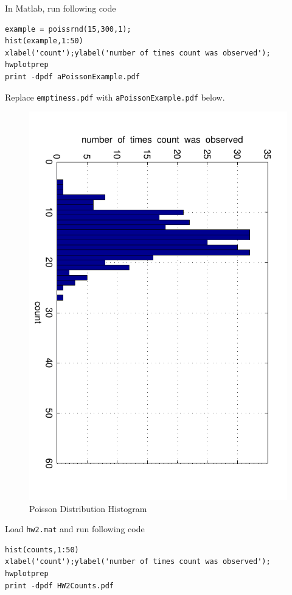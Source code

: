 \documentclass{article}
\begin{document}
{\newproblem{1pt}
In Matlab, run following code
\begin{verbatim}
example = poissrnd(15,300,1);
hist(example,1:50)
xlabel('count');ylabel('number of times count was observed');
hwplotprep
print -dpdf aPoissonExample.pdf
\end{verbatim}
Replace \texttt{emptiness.pdf} with \texttt{aPoissonExample.pdf} below.

\begin{figure}[H]
\begin{center}
\includegraphics[scale=0.5, angle=90]{aPoissonExample.pdf}
\caption{Poisson Distribution Histogram}
\end{center}
\end{figure}

Load \texttt{hw2.mat} and run following code
\begin{verbatim}
hist(counts,1:50)
xlabel('count');ylabel('number of times count was observed');
hwplotprep
print -dpdf HW2Counts.pdf
\end{verbatim}

}
\end{document}
